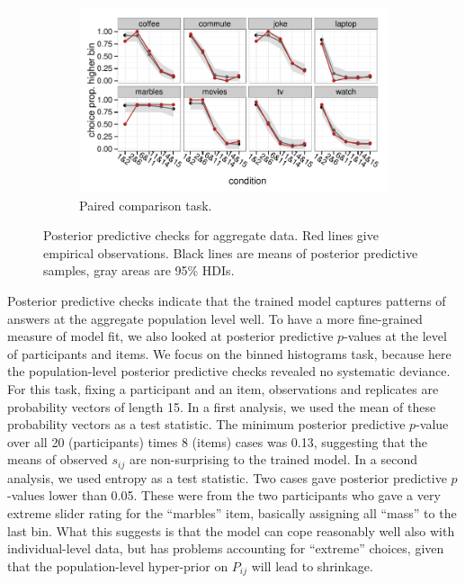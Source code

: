 \documentclass[10pt,letterpaper]{article}
\newcommand{\citep}[1]{\cite{#1}}
\begin{document}
\begin{figure}
  \begin{subfigure}[b]{0.5\textwidth}
    \includegraphics[width = \textwidth]{plots/ppc_choice.pdf}
    \caption{Paired comparison task.}
    \label{fig:lightingPPC}
  \end{subfigure}

  \caption{Posterior predictive checks for aggregate data. Red lines give empirical
    observations. Black lines are means of posterior predictive samples, gray areas are
    95\% HDIs.}
  \label{fig:PPCs}
\end{figure}

Posterior predictive checks indicate that the trained model captures patterns of answers at the
aggregate population level well. To have a more fine-grained measure of model fit, we also
looked at posterior predictive $p$-values \citep{GelmanCarlin2014:Bayesian-Data-A} at the level
of participants and items. We focus on the binned histograms task, because here the
population-level posterior predictive checks revealed no systematic deviance. For this task,
fixing a participant and an item, observations and replicates are probability vectors of length
15. In a first analysis, we used the mean of these probability vectors as a test statistic. The
minimum posterior predictive $p$-value over all 20 (participants) times 8 (items) cases was
0.13, suggesting that the means of observed $s_{ij}$ are non-surprising to the trained
model. In a second analysis, we used entropy as a test statistic. Two cases gave posterior
predictive $p$-values lower than 0.05. These were from the two participants who gave a very
extreme slider rating for the ``marbles'' item, basically assigning all ``mass'' to the last
bin. What this suggests is that the model can cope reasonably well also with individual-level
data, but has problems accounting for ``extreme'' choices, given that the population-level
hyper-prior on $P_{ij}$ will lead to shrinkage.
\end{document}
